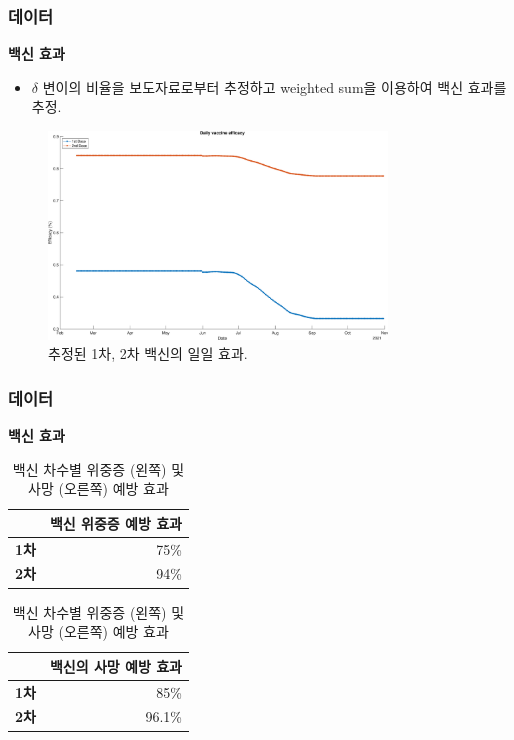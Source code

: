 \documentclass[aspectratio=169, 9pt, xcolor=dvipsnames]{beamer}
\begin{document}
	\begin{frame}\frametitle{데이터}
	    \textbf{백신 효과}
		\begin{itemize}
			\item $\delta$ 변이의 비율을 보도자료로부터 추정하고 weighted sum을 이용하여 백신 효과를 추정.
		\end{itemize}
		\begin{figure}
			\centering
			\includegraphics[width=9cm]{../results/data/vaccine_efficacy.eps}
			\caption{추정된 1차, 2차 백신의 일일 효과.}
		\end{figure}
	\end{frame}

	\begin{frame}\frametitle{데이터}
		\textbf{백신 효과}
	    \begin{table}
	    	\begin{tabular}{cr}
	    		\toprule
	    		 & \textbf{백신 위중증 예방 효과} \\
	    		\midrule
	    		\textbf{1차} & 75\%\footnotemark[2] \\
	    		\textbf{2차} & 94\%\footnotemark[2] \\
	    		\bottomrule
	    	\end{tabular}
	    	\hspace{1cm}
	    	\begin{tabular}{cr}
	    		\toprule
	    		 & \textbf{백신의 사망 예방 효과} \\
	    		\midrule
	    		\textbf{1차} & 85\%\footnotemark[3] \\
	    		\textbf{2차} & 96.1\%\footnotemark[4] \\
	    		\bottomrule
	    	\end{tabular}
	    	\caption{백신 차수별 위중증 (왼쪽) 및 사망 (오른쪽) 예방 효과}
	    \end{table}
	\end{frame}
\end{document}
